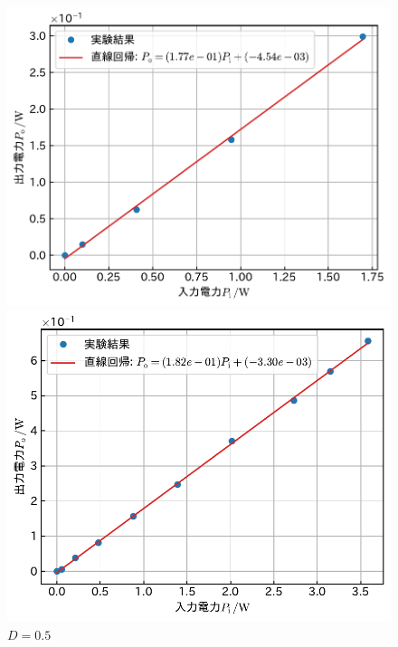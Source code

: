 \documentclass[1_power_supply.tex]{subfiles}
\begin{document}
\begin{figure}[htbp]
		\vspace{1.5mm}
		\begin{minipage}{0.45\columnwidth}
			\centering
			\includegraphics[width=0.8\columnwidth]{2_40p.pdf}
			\caption{$D=0.4$}\label{fig:2_40p}
		\end{minipage}
		\begin{minipage}{0.45\columnwidth}
			\centering
			\includegraphics[width=0.8\columnwidth]{2_50p.pdf}
			\caption{$D=0.5$}\label{fig:2_50p}
		\end{minipage}


\end{figure}
\end{document}
